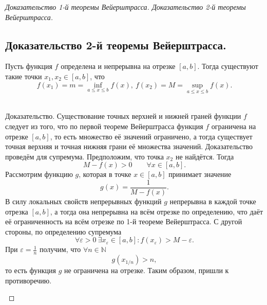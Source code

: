 \begin{proof}[Доказательство 1-й теоремы Вейерштрасса. Доказательство 2-й теоремы Вейерштрасса]
    \subsection*{Доказательство 2-й теоремы Вейерштрасса.}
    \begin{note}[amber]
        Пусть функция $f$ определена и непрерывна на отрезке $[a, b]$. Тогда существуют такие точки  $x_1, x_2 \in [a,b]$, что
        \[
        f(x_1)=m=\inf_{a\le x\le b} f(x), \ f(x_2)=M=\sup_{a\le x\le b} f(x).
        \]\\
        \begin{note}[purple]
            Доказательство.  Существование точных верхней и нижней граней функции $f$ следует из того, что по первой теореме Вейерштрасса функция $f$ ограничена на отрезке $[a,b]$, то есть множество её значений ограничено, а тогда существует 
            точная верхняя и точная нижняя грани её множества значений.
            Доказательство проведём для супремума. Предположим, что точка $x_2$ не найдётся. Тогда
            \[
            M-f(x)>0 \qquad \forall x\in [a,b].
            \]
            Рассмотрим функцию $g$, которая в точке $x\in [a,b]$ принимает значение
            \[
            g(x)=\frac{1}{M-f(x)}.
            \]
            В силу локальных свойств непрерывных функций $g$ непрерывна в каждой точке отрезка $[a,b]$, а тогда она непрерывна на всём отрезке по определению, что даёт её ограниченность на всём отрезке по 1-й теореме Вейерштрасса. С другой стороны, по определению супремума
            \[
            \forall \varepsilon>0 \ \exists x_\varepsilon\in [a,b] :
            f(x_\varepsilon)>M - \varepsilon.
            \]
            При $\varepsilon=\frac{1}{n}$ получим, что $\forall n\in\mathbb{N}$
            \[
            g(x_{1/n})>n,
            \]
            то есть функция $g$ не ограничена на отрезке. Таким образом, пришли к противоречию.
        \end{note}
    \end{note}
\end{proof}

